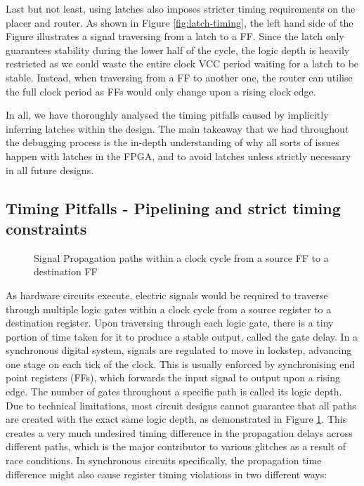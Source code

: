 \documentclass[a4paper]{report}
\begin{document}
Last but not least, using latches also imposes stricter timing requirements on the placer and router. As shown in Figure \ref{fig:latch-timing}, the left hand side of the Figure illustrates a signal traversing from a latch to a FF. Since the latch only guarantees stability during the lower half of the cycle, the logic depth is heavily restricted as we could waste the entire clock VCC period waiting for a latch to be stable. Instead, when traversing from a FF to another one, the router can utilise the full clock period as FFs would only change upon a rising clock edge.

In all, we have thoroughly analysed the timing pitfalls caused by implicitly inferring latches within the design. The main takeaway that we had throughout the debugging process is the in-depth understanding of why all sorts of issues happen with latches in the FPGA, and to avoid latches unless strictly necessary in all future designs.

\subsection{Timing Pitfalls - Pipelining and strict timing constraints}
\label{section:implementation-hardware-implementation-timing}

\begin{figure}[h!]
  \caption{Signal Propagation paths within a clock cycle from a source FF to a destination FF}
  \label{fig:timing-path}
\end{figure}

As hardware circuits execute, electric signals would be required to traverse through multiple logic gates within a clock cycle from a source register to a destination register. Upon traversing through each logic gate, there is a tiny portion of time taken for it to produce a stable output, called the gate delay. In a synchronous digital system, signals are regulated to move in lockstep, advancing one stage on each tick of the clock. This is usually enforced by synchronising end point registers (FFs), which forwards the input signal to output upon a rising edge. The number of gates throughout a specific path is called its logic depth. Due to technical limitations, most circuit designs cannot guarantee that all paths are created with the exact same logic depth, as demonstrated in Figure \ref{fig:timing-path}. This creates a very much undesired timing difference in the propagation delays across different paths, which is the major contributor to various glitches as a result of race conditions. In synchronous circuits specifically, the propagation time difference might also cause register timing violations in two different ways:
\end{document}
